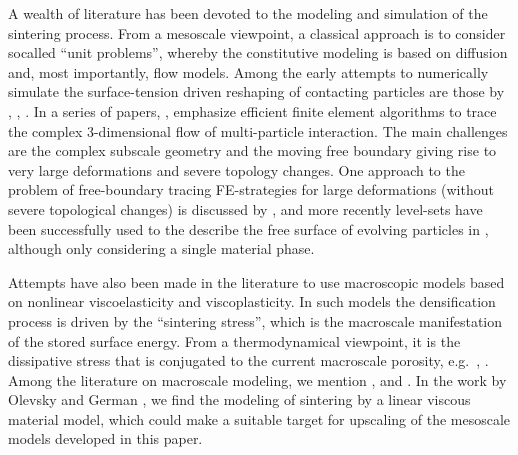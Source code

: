 \documentclass[12pt,a4paper]{article}
\begin{document}
A wealth of literature has been devoted to the modeling and simulation of the sintering process.
From a mesoscale viewpoint, a classical approach is to consider socalled ``unit problems'', whereby the constitutive modeling is based on diffusion and, most importantly, flow models.
Among the early attempts to numerically simulate the surface-tension driven reshaping of contacting particles are those by \cite{jagota_micromechanical_1988}, \cite{jagota_micromechanical_1988-1}, \cite{van_de_vorst_integral_1993}.
In a series of papers, \cite{zhou_three-dimensional_1998}, \cite{zhou_assessment_2001} emphasize efficient finite element algorithms to trace the complex 3-dimensional flow of multi-particle interaction.
The main challenges  are the complex subscale geometry and the moving free boundary giving rise to very large deformations and severe topology changes.
One approach to the problem of free-boundary tracing FE-strategies for large deformations (without severe topological changes) is discussed by \cite{dettmer_computational_2006}, and more recently level-sets have been successfully used to the describe the free surface of evolving particles in \cite{pino_munoz_direct_2013}, although only considering a single material phase.


Attempts have also been made in the literature to use macroscopic models based on nonlinear viscoelasticity and viscoplasticity.
In such models the densification process is driven by the ``sintering stress'', which is the macroscale manifestation of the stored surface energy.
From a thermodynamical viewpoint, it is the dissipative stress that is conjugated to the current macroscale porosity, e.g.\ \cite{reid_continuum_1990}, \cite{mahler_modelling_2000}.
Among the literature on macroscale modeling, we mention \cite{svoboda_model_1996}, \cite{xu_micromechanical_1997} and \cite{lu_porosity_2001}.
In the work by Olevsky and German \cite{olevsky_theory_1998}, \cite{olevsky_effect_2000} we find the modeling of sintering by a linear viscous material model, which could make a suitable target for upscaling of the mesoscale models developed in this paper.



\end{document}
